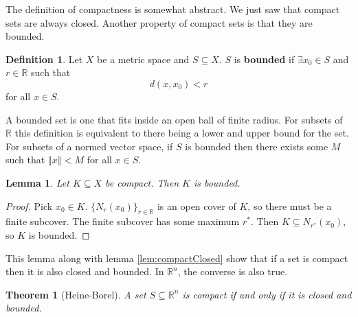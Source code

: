 \documentclass[12pt,reqno]{amsart}
\newtheorem{theorem}{Theorem}[section]
\newtheorem{lemma}{Lemma}[section]
\theoremstyle{definition}
\newtheorem{definition}{Definition}[section]
\def\R{\mathbb{R}}
\newcommand{\norm}[1]{\left\Vert {#1} \right\Vert}
\begin{document}
The definition of compactness is somewhat abstract. We just saw that
compact sets are always closed. Another property of compact sets is
that they are bounded. 
\begin{definition}
  Let $X$ be a metric space and $S \subseteq X$. $S$ is
  \textbf{bounded} if $\exists x_0 \in S$ and $r \in \R$ such that 
  \[ d(x,x_0) < r \]
  for all $x \in S$.
\end{definition}
A bounded set is one that fits inside an open ball of finite
radius. For subsets of $\R$ this definition is equivalent to there
being a lower and upper bound for the set. For subsets of a normed
vector space, if $S$ is bounded then there exists some $M$ such that
$\norm{x} < M$ for all $x \in S$. 
\begin{lemma}
  Let $K \subseteq X$ be compact. Then $K$ is bounded. 
\end{lemma}
\begin{proof}
  Pick $x_0 \in K$. $\{N_{r}(x_0) \}_{r \in \R}$ is an open cover of
  $K$, so there must be a finite subcover. The finite subcover has
  some maximum $r^*$. Then $K \subseteq N_{r^*}(x_0)$, so $K$ is bounded.
\end{proof}
This lemma along with lemma \ref{lem:compactClosed} show that if a set
is compact then it is also closed and bounded. In $\R^n$, the converse
is also true.
\begin{theorem}[Heine-Borel]\label{thm:hb}
  A set $S \subseteq \R^n$ is compact if and only if it is closed and
  bounded. 
\end{theorem}
\end{document}
